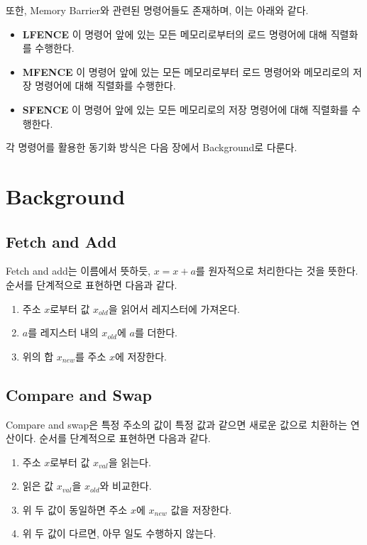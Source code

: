 \documentclass[11pt, a4paper]{article}
\begin{document}
또한, Memory Barrier와 관련된 명령어들도 존재하며, 이는 아래와 같다.

\begin{itemize}
	\item \textbf{LFENCE} 이 명령어 앞에 있는 모든 메모리로부터의 로드 명령어에 대해 직렬화를 수행한다.
	\item \textbf{MFENCE} 이 명령어 앞에 있는 모든 메모리로부터 로드 명령어와 메모리로의 저장 명령어에 대해 직렬화를 수행한다.
	\item \textbf{SFENCE} 이 명령어 앞에 있는 모든 메모리로의 저장 명령어에 대해 직렬화를 수행한다.
\end{itemize}

각 명령어를 활용한 동기화 방식은 다음 장에서 Background로 다룬다.

\section{Background}
\subsection{Fetch and Add}
Fetch and add는 이름에서 뜻하듯, $x = x + a$를 원자적으로 처리한다는 것을 뜻한다. 순서를 단계적으로 표현하면 다음과 같다.

\begin{enumerate}
	\item 주소 $x$로부터 값 $x_{old}$을 읽어서 레지스터에 가져온다.
	\item $a$를 레지스터 내의 $x_{old}$에 $a$를 더한다.
	\item 위의 합 $x_{new}$를 주소 $x$에 저장한다.
\end{enumerate}

\subsection{Compare and Swap}
Compare and swap은 특정 주소의 값이 특정 값과 같으면 새로운 값으로 치환하는 연산이다. 순서를 단계적으로 표현하면 다음과 같다.

\begin{enumerate}
	\item 주소 $x$로부터 값 $x_{val}$을 읽는다.
	\item 읽은 값 $x_{val}$을 $x_{old}$와 비교한다.
	\item 위 두 값이 동일하면 주소 $x$에 $x_{new}$ 값을 저장한다.
	\item 위 두 값이 다르면, 아무 일도 수행하지 않는다.
\end{enumerate}
\end{document}
